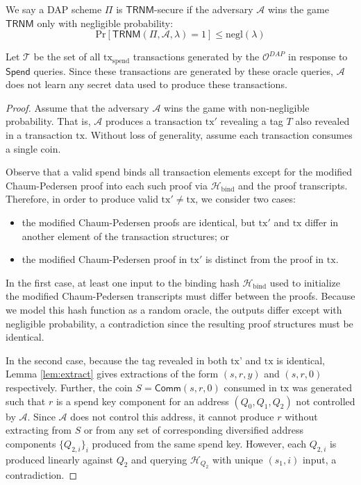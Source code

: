 \documentclass{llncs}
\newcommand{\hash}{\mathcal{H}}
\newcommand{\func}[1]{\mathsf{#1}}
\newcommand{\comm}{\func{Comm}}
\begin{document}
We say a DAP scheme $\Pi$ is $\func{TRNM}$-secure if the adversary $\mathcal{A}$ wins the game $\func{TRNM}$ only with negligible probability:
$$\text{Pr}[\func{TRNM}(\Pi, \mathcal{A}, \lambda) = 1] \leq \text{negl}(\lambda)$$

Let $\mathcal{T}$ be the set of all $\text{tx}_{\text{spend}}$ transactions generated by the $\mathcal{O}^{DAP}$ in response to $\func{Spend}$ queries.
Since these transactions are generated by these oracle queries, $\mathcal{A}$ does not learn any secret data used to produce these transactions.

\begin{proof}
Assume that the adversary $\mathcal{A}$ wins the game with non-negligible probability.
That is, $\mathcal{A}$ produces a transaction $\text{tx}'$ revealing a tag $T$ also revealed in a transaction $\text{tx}$.
Without loss of generality, assume each transaction consumes a single coin.

Observe that a valid spend binds all transaction elements except for the modified Chaum-Pedersen proof into each such proof via $\hash_{\text{bind}}$ and the proof transcripts.
Therefore, in order to produce valid $\text{tx}' \neq \text{tx}$, we consider two cases:
\begin{itemize}
    \item the modified Chaum-Pedersen proofs are identical, but $\text{tx}'$ and $\text{tx}$ differ in another element of the transaction structures; or
    \item the modified Chaum-Pedersen proof in $\text{tx}'$ is distinct from the proof in $\text{tx}$.
\end{itemize}

In the first case, at least one input to the binding hash $\hash_{\text{bind}}$ used to initialize the modified Chaum-Pedersen transcripts must differ between the proofs.
Because we model this hash function as a random oracle, the outputs differ except with negligible probability, a contradiction since the resulting proof structures must be identical.

In the second case, because the tag revealed in both $\text{tx'}$ and $\text{tx}$ is identical, Lemma \ref{lem:extract} gives extractions of the form $(s,r,y)$ and $(s,r,0)$ respectively.
Further, the coin $S = \comm(s,r,0)$ consumed in $\text{tx}$ was generated such that $r$ is a spend key component for an address $(Q_0,Q_1,Q_2)$ not controlled by $\mathcal{A}$.
Since $\mathcal{A}$ does not control this address, it cannot produce $r$ without extracting from $S$ or from any set of corresponding diversified address components $\{Q_{2,i}\}_i$ produced from the same spend key.
However, each $Q_{2,i}$ is produced linearly against $Q_2$ and querying $\hash_{Q_2}$ with unique $(s_1,i)$ input, a contradiction.
\end{proof}
\end{document}

